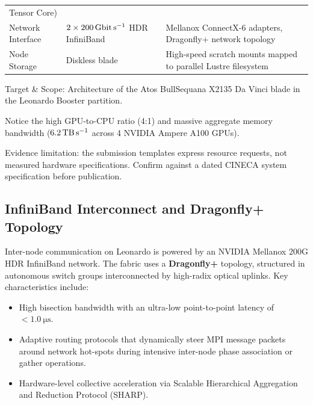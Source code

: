 \begin{table}[htbp]
\begin{threeparttable}
\begin{tabularx}{\linewidth}{l l >{\raggedright\arraybackslash}X}
      Tensor Core) \\
      Network Interface & $\num{2} \times \qty{200}{\giga\bit\per\second}$
      HDR InfiniBand & Mellanox ConnectX-6 adapters, Dragonfly+ network
      topology \\
      Node Storage & Diskless blade & High-speed scratch mounts
      mapped to parallel Lustre filesystem \\
      \bottomrule
    \end{tabularx}
    \begin{tablenotes}[flushleft]
      \footnotesize
    \item Target \& Scope: Architecture of the Atos BullSequana
      X2135 Da Vinci blade in the Leonardo Booster partition.
    \item Notice the high \ac{GPU}-to-\ac{CPU} ratio (\num{4}:\num{1}) and
      massive aggregate memory bandwidth ($\qty{6.2}{\tera\byte\per\second}$
      across \num{4} NVIDIA Ampere A100 \acp{GPU}).
    \item Evidence limitation: the submission templates express
      resource requests, not measured hardware specifications.
      Confirm against a dated \ac{CINECA} system specification
      before publication.
    \end{tablenotes}
  \end{threeparttable}
\end{table}

\subsection{InfiniBand Interconnect and Dragonfly+ Topology}
Inter-node communication on Leonardo is powered by an NVIDIA
Mellanox 200G HDR InfiniBand network. The fabric uses a
\textbf{Dragonfly+} topology, structured in autonomous switch groups
interconnected by high-radix optical uplinks. Key characteristics include:
\begin{itemize}
  \item High bisection bandwidth with an ultra-low point-to-point
    latency of $< \qty{1.0}{\micro\second}$.
  \item Adaptive routing protocols that dynamically steer \ac{MPI}
    message packets around network hot-spots during intensive
    inter-node phase association or gather operations.
  \item Hardware-level collective acceleration via Scalable
    Hierarchical Aggregation and Reduction Protocol (SHARP).
\end{itemize}

